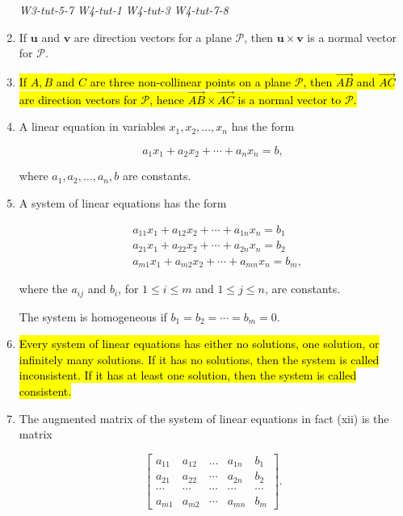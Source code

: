 \documentclass[10pt]{article}
\begin{document}
\begin{enumerate}
\textit{W3-tut-5-7}
\textit{W4-tut-1}
\textit{W4-tut-3}
\textit{W4-tut-7-8}

\item If $\mathbf{u}$ and $\mathbf{v}$ are direction vectors for a plane $\mathcal{P}$, then $\mathbf{u} \times \mathbf{v}$ is a normal vector for $\mathcal{P}$.

\item \hl{If $A, B$ and $C$ are three non-collinear points on a plane $\mathcal{P}$, then $\overrightarrow{A B}$ and $\overrightarrow{A C}$ are direction vectors for $\mathcal{P}$, hence $\overrightarrow{A B} \times \overrightarrow{A C}$ is a normal vector to $\mathcal{P}$. }

\item A linear equation in variables $x_{1}, x_{2}, \ldots, x_{n}$ has the form

$$
a_{1} x_{1}+a_{2} x_{2}+\cdots+a_{n} x_{n}=b,
$$

where $a_{1}, a_{2}, \ldots, a_{n}, b$ are constants.

\item A system of linear equations has the form

$$
\begin{aligned}
& a_{11} x_{1}+a_{12} x_{2}+\cdots+a_{1 n} x_{n}=b_{1} \\
& a_{21} x_{1}+a_{22} x_{2}+\cdots+a_{2 n} x_{n}=b_{2} \\
& a_{m 1} x_{1}+a_{m 2} x_{2}+\cdots+a_{m n} x_{n}=b_{m},
\end{aligned}
$$

where the $a_{i j}$ and $b_{i}$, for $1 \leq i \leq m$ and $1 \leq j \leq n$, are constants.

The system is homogeneous if $b_{1}=b_{2}=\cdots=b_{m}=0$.

\item \hl{Every system of linear equations has either no solutions, one solution, or infinitely many solutions. If it has no solutions, then the system is called inconsistent. If it has at least one solution, then the system is called consistent.}

\item The augmented matrix of the system of linear equations in fact (xii) is the matrix

$$
\left[\begin{array}{cccc|c}
a_{11} & a_{12} & \ldots & a_{1 n} & b_{1} \\
a_{21} & a_{22} & \cdots & a_{2 n} & b_{2} \\
\cdots & \cdots & \cdots & \cdots & \cdots \\
a_{m 1} & a_{m 2} & \cdots & a_{m n} & b_{m}
\end{array}\right] .
$$


\end{enumerate}
\end{document}
